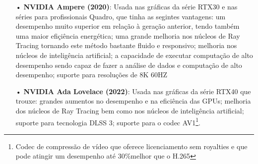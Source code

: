 \documentclass[a4paper,11pt,]{report}
\begin{document}
\begin{itemize}
\pagebreak
 \item[•] \textbf{NVIDIA Ampere (2020)}: Usada nas gráficas da série RTX30 e nas séries para profissionais Quadro, que tinha as segintes vantagens: um desempenho muito superior em relação à geração anterior, tendo também uma maior efiçiência energética; uma grande melhoria nos núcleos de Ray Tracing tornando este método bastante fluido e responsivo; melhoria nos núcleos de inteligência artificial; a capacidade de executar computação de alto desempenho sendo capaz de fazer a análise de dados e computação de alto desempenho; suporte para resoluções de 8K 60HZ
 \item[•] \textbf{NVIDIA Ada Lovelace (2022)}: Usada nas gráficas da série RTX40 que trouxe: grandes aumentos no desempenho e na eficiência das GPUs; melhoria dos núcleos de Ray Tracing bem como nos núcleos de inteligência artificial; suporte para tecnologia DLSS 3; suporte para o codec AV1\footnote{Codec de compressão de vídeo que oferece licenciamento sem royalties e que pode atingir um desempenho até 30\%melhor que o H.265}.
\end{itemize}
\end{document}

